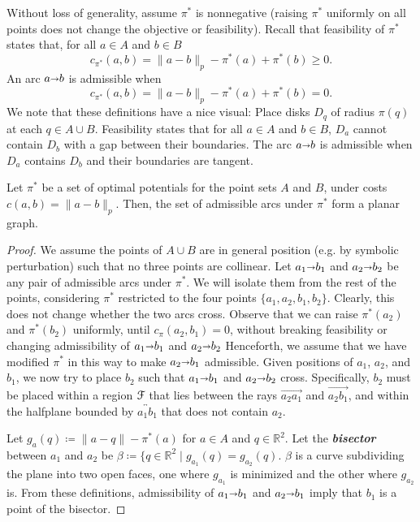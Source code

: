 \documentclass[a4paper,UKenglish]{socg-lipics-v2018}
\def\reals{\mathbb{R}}
\def\norm#1{\mathopen\| #1 \mathclose\|}	%
\def\arcto{\mathord\shortrightarrow}
\def\arc#1#2{#1\arcto#2}
\theoremstyle{plain}
\numberwithin{figure}{section}
\def\EMPH#1{\textbf{\emph{\boldmath #1}}}
\begin{document}
\begin{toappendix}
Without loss of generality, assume $\pi^*$ is nonnegative (raising $\pi^*$
uniformly on all points does not change the objective or feasibility).
Recall that feasibility of $\pi^*$ states that, for all $a \in A$ and $b \in B$
\[
	c_{\pi^*}(a, b) = \norm{a-b}_p - \pi^*(a) + \pi^*(b) \geq 0.
\]
An arc $\arc ab$ is admissible when
\[
	c_{\pi^*}(a, b) = \norm{a-b}_p - \pi^*(a) + \pi^*(b) = 0.
\]
We note that these definitions have a nice visual:
Place disks $D_q$ of radius $\pi(q)$ at each $q \in A \cup B$.
Feasibility states that for all $a \in A$ and $b \in B$, $D_a$ cannot contain
$D_b$ with a gap between their boundaries.
The arc $\arc ab$ is admissible when $D_a$ contains $D_b$ and their boundaries
are tangent.

\begin{lemmarep}
\label{lemma:admiss_planar}
Let $\pi^*$ be a set of optimal potentials for the point sets $A$ and $B$,
under costs $c(a, b) = \norm{a-b}_p$.
Then, the set of admissible arcs under $\pi^*$ form a planar graph.
\end{lemmarep}

\begin{proof}
We assume the points of $A \cup B$ are in general position (e.g. by symbolic
perturbation) such that no three points are collinear.
Let $\arc{a_1}{b_1}$ and $\arc{a_2}{b_2}$ be any pair of admissible arcs under
$\pi^*$.
We will isolate them from the rest of the points, considering $\pi^*$
restricted to the four points $\{a_1, a_2, b_1, b_2\}$.
Clearly, this does not change whether the two arcs cross.
Observe that we can raise $\pi^*(a_2)$ and $\pi^*(b_2)$ uniformly, until
$c_\pi(a_2, b_1) = 0$, without breaking feasibility or changing admissibility
of $\arc{a_1}{b_1}$ and $\arc{a_2}{b_2}$
Henceforth, we assume that we have modified $\pi^*$ in this way to make
$\arc{a_2}{b_1}$ admissible.
Given positions of $a_1$, $a_2$, and $b_1$, we now try to place $b_2$ such that
$\arc{a_1}{b_1}$ and $\arc{a_2}{b_2}$ cross.
Specifically, $b_2$ must be placed within a region $\EuScript{F}$ that lies
between the rays $\overrightarrow{a_2 a_1}$ and $\overrightarrow{a_2 b_1}$,
and within the halfplane bounded by $\overleftrightarrow{a_1 b_1}$ that does
not contain $a_2$.

Let $g_a(q) \coloneqq \norm{a-q} - \pi^*(a)$ for $a \in A$ and
$q \in \reals^2$.
Let the \EMPH{bisector} between $a_1$ and $a_2$ be
$\beta \coloneqq \{q \in \reals^2 \mid g_{a_1}(q) = g_{a_2}(q)$.
$\beta$ is a curve subdividing the plane into two open faces, one where
$g_{a_1}$ is minimized and the other where $g_{a_2}$ is.
From these definitions, admissibility of $\arc{a_1}{b_1}$ and $\arc{a_2}{b_1}$
imply that $b_1$ is a point of the bisector.


\end{proof}
\end{toappendix}
\end{document}

